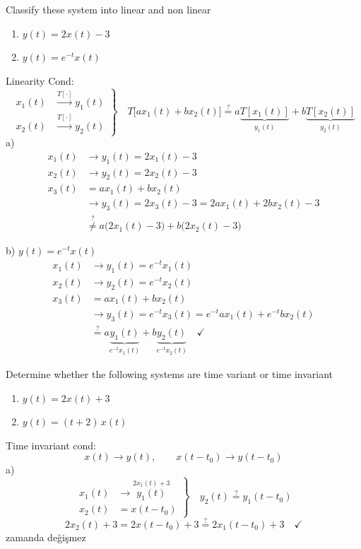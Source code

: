 \documentclass[11pt,a4paper]{article}
\begin{document}

\begin{ornek}
  Classify these system into linear and non linear
  \begin{enumerate}[label=\alph*),nosep,leftmargin=*]
    \item $y(t)=2x(t)-3$
    \item $y(t)=e^{-t}x(t)$
  \end{enumerate}
\end{ornek}
Linearity Cond:
\[
  \left.\begin{aligned}
    x_1(t)&\xrightarrow{T[\cdot]}y_1(t)\\
    x_2(t)&\xrightarrow{T[\cdot]}y_2(t)
  \end{aligned}\right\}
  \quad T\bigl[ax_1(t)+bx_2(t)\bigr]\overset{?}{=}a\underbrace{T[x_1(t)]}_{y_1(t)}+b\underbrace{T[x_2(t)]}_{y_2(t)}
\]
a)
\begin{align*}
  x_1(t)&\to y_1(t)=2x_1(t)-3\\
  x_2(t)&\to y_2(t)=2x_2(t)-3\\
  x_3(t)&=ax_1(t)+bx_2(t)\\
  &\to y_3(t)=2x_3(t)-3=2ax_1(t)+2bx_2(t)-3\\
  &\overset{?}{\neq}a\bigl(2x_1(t)-3\bigr)+b\bigl(2x_2(t)-3\bigr)
\end{align*}

b) $y(t)=e^{-t}x(t)$
\begin{align*}
  x_1(t)&\to y_1(t)=e^{-t}x_1(t)\\
  x_2(t)&\to y_2(t)=e^{-t}x_2(t)\\
  x_3(t)&=ax_1(t)+bx_2(t)\\
  &\to y_3(t)=e^{-t}x_3(t)=e^{-t}ax_1(t)+e^{-t}bx_2(t)\\
  &\overset{?}{=}a\underbrace{y_1(t)}_{e^{-t}x_1(t)}+b\underbrace{y_2(t)}_{e^{-t}x_2(t)}\quad\checkmark
\end{align*}

\begin{ornek}
  Determine whether the following systems are time variant or time invariant
  \begin{enumerate}[label=\alph*),nosep,leftmargin=*]
    \item $y(t)=2x(t)+3$
    \item $y(t)=(t+2)\,x(t)$
  \end{enumerate}
\end{ornek}
Time invariant cond:
\[ x(t)\to y(t),\qquad x(t-t_0)\to y(t-t_0) \]
a)
\[
  \left.\begin{aligned}
    x_1(t)&\to\overset{2x_1(t)+3}{y_1(t)}\\
    x_2(t)&=x(t-t_0)
  \end{aligned}\right\}
  \quad y_2(t)\overset{?}{=}y_1(t-t_0)
\]
\[ 2x_2(t)+3=2x(t-t_0)+3\overset{?}{=}2x_1(t-t_0)+3\quad\checkmark \]
zamanda değişmez
\end{document}
